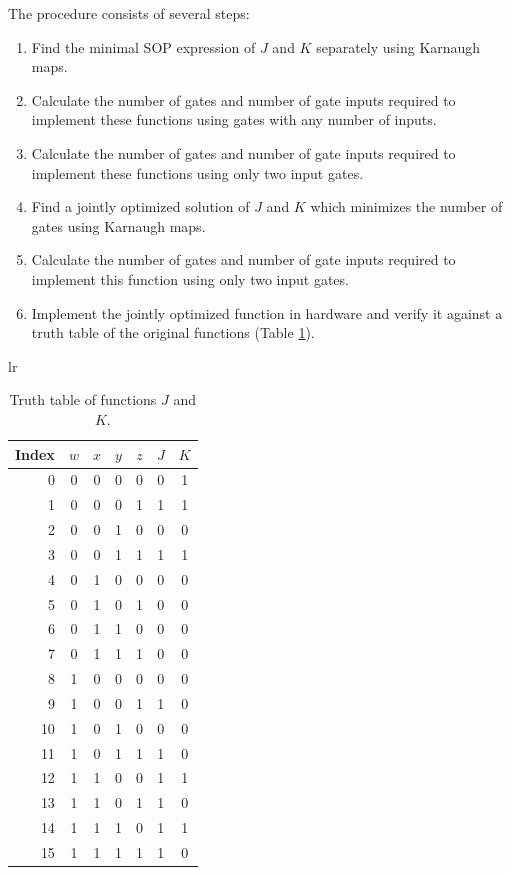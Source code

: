 \documentclass[12pt]{article}
\begin{document}
\begin{samepage}
The procedure consists of several steps:
\begin{enumerate}
	\item Find the minimal SOP expression of $J$ and $K$ separately
	using Karnaugh maps.
	\item Calculate the number of gates and number of gate inputs required
	to implement these functions using gates with any number of inputs.
	\item Calculate the number of gates and number of gate inputs required
	to implement these functions using only two input gates.
	\item Find a jointly optimized solution of $J$ and $K$ which minimizes
	the number of gates using Karnaugh maps.
	\item Calculate the number of gates and number of gate inputs required
	to implement this function using only two input gates.
	\item Implement the jointly optimized function in hardware and verify
	it against a truth table of the original functions (Table \ref{tbl:tt}).
\end{enumerate}
\end{samepage}

\begin{table}[htb]
\begin{center}
\begin{tabular}{lr}
  \begin{tabular}[t]{r|cccc|c|c}
  Index&$w$&$x$&$y$&$z$&$J$&$K$\\
  \hline
  0  &0&0&0&0 &0 &1\\
  1  &0&0&0&1 &1 &1\\
  2  &0&0&1&0 &0 &0\\
  3  &0&0&1&1 &1 &1\\
  4  &0&1&0&0 &0 &0\\
  5  &0&1&0&1 &0 &0\\
  6  &0&1&1&0 &0 &0\\
  7  &0&1&1&1 &0 &0\\
  8  &1&0&0&0 &0 &0\\
  9  &1&0&0&1 &1 &0\\
  10 &1&0&1&0 &0 &0\\
  11 &1&0&1&1 &1 &0\\
  12 &1&1&0&0 &1 &1\\
  13 &1&1&0&1 &1 &0\\
  14 &1&1&1&0 &1 &1\\
  15 &1&1&1&1 &1 &0\\
  \end{tabular}
\end{tabular}
\end{center}
\caption{Truth table of functions $J$ and $K$.}
\label{tbl:tt}
\end{table}
\end{document}
